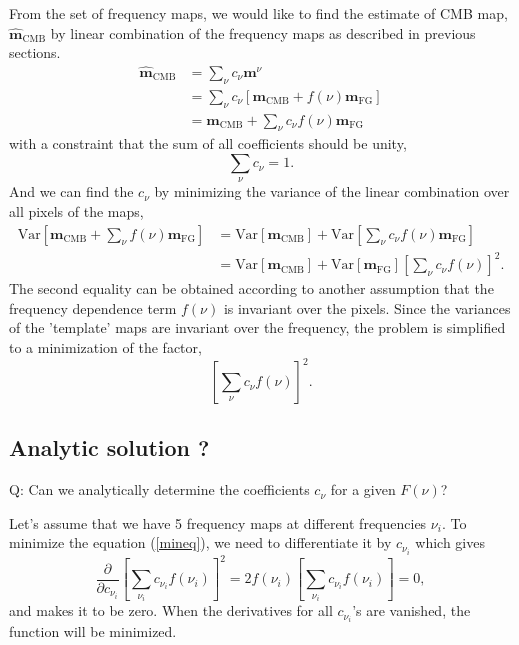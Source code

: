 \documentclass[11pt]{article}
\begin{document}
From the set of frequency maps, we would like to find the estimate of CMB map, $\hat{\textbf{m}} _\text{CMB}$ by linear combination of the frequency maps as described in previous sections.
\begin{equation}
\begin{split}
    \hat{\textbf{m}}_\text{CMB} &= \sum_\nu c_\nu \textbf{m}^{\nu} \\
    &= \sum_\nu c_\nu \left[\mathbf{m}_{\text{CMB}} + f(\nu) \mathbf{m}_{\text{FG}} \right] \\
    &= \textbf{m}_\text{CMB} + \sum_\nu c_\nu f(\nu) \textbf{m}_\text{FG}
\end{split}
\end{equation}
with a constraint that the sum of all coefficients should be unity,
\begin{equation}\label{cons1}
    \sum_\nu c_\nu = 1.
\end{equation}
And we can find the $c_\nu$ by minimizing the variance of the linear combination over all pixels of the maps, 
\begin{equation}
\begin{split}
    \text{Var}\left[\textbf{m}_\text{CMB} + \sum_\nu f(\nu) \textbf{m}_\text{FG} \right] &= \text{Var}[\textbf{m}_\text{CMB}] + \text{Var}\left[ \sum_\nu c_\nu f(\nu) \textbf{m}_\text{FG} \right] \\
    &= \text{Var}[\textbf{m}_\text{CMB}] + \text{Var}\left[\textbf{m}_\text{FG} \right]\left[\sum_\nu c_\nu f(\nu) \right]^2.
\end{split}
\end{equation}
The second equality can be obtained according to another assumption that the frequency dependence term $f(\nu)$ is invariant over the pixels.
Since the variances of the 'template' maps are invariant over the frequency, the problem is simplified to a minimization of the factor, 
\begin{equation}\label{mineq}
    \left[ \sum_\nu c_\nu f(\nu) \right] ^2 .
\end{equation}

\subsection{Analytic solution ?}
Q: Can we analytically determine the coefficients $c_\nu$ for a given $F(\nu)$?

Let's assume that we have 5 frequency maps at different frequencies $\nu_i$. 
To minimize the equation (\ref{mineq}), we need to differentiate it by $c_{\nu_i}$ which gives
\begin{equation}
    \frac{\partial}{\partial c_{\nu_i}} \left[ \sum_{\nu_i} c_{\nu_i} f(\nu_i) \right]^2 = 2f(\nu_i)\left[ \sum_{\nu_i} c_{\nu_i} f(\nu_i) \right] = 0, 
\end{equation}
and makes it to be zero. When the derivatives for all $c_{\nu_i}$'s are vanished, the function will be minimized. 
\end{document}
